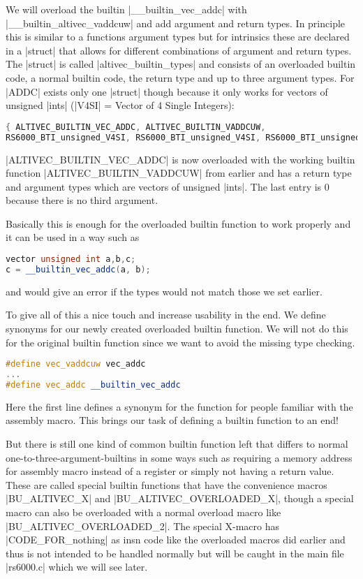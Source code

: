 We will overload the builtin |__builtin_vec_addc| with |__builtin_altivec_vaddcuw| and add argument and return types. In principle this is similar to a functions argument types but for intrinsics these are declared in a |struct| that allows for different combinations of argument and return types. The |struct| is called |altivec_builtin_types| and consists of an overloaded builtin code, a normal builtin code, the return type and up to three argument types. For |ADDC| exists only one |struct| though because it only works for vectors of unsigned |ints| (|V4SI| = Vector of 4 Single Integers):
\begin{lstlisting}[language=C++,basicstyle=\ttfamily\scriptsize,keywordstyle=\color{red}]
{ ALTIVEC_BUILTIN_VEC_ADDC, ALTIVEC_BUILTIN_VADDCUW,
RS6000_BTI_unsigned_V4SI, RS6000_BTI_unsigned_V4SI, RS6000_BTI_unsigned_V4SI, 0 }			
\end{lstlisting}
|ALTIVEC_BUILTIN_VEC_ADDC| is now overloaded with the working builtin function |ALTIVEC_BUILTIN_VADDCUW| from earlier and has a return type and argument types which are vectors of unsigned |ints|. The last entry is 0 because there is no third argument.

Basically this is enough for the overloaded builtin function to work properly and it can be used in a way such as
\begin{lstlisting}[language=C++,basicstyle=\ttfamily\scriptsize,keywordstyle=\color{red}] 
vector unsigned int a,b,c;
c = __builtin_vec_addc(a, b);
\end{lstlisting}
and would give an error if the types would not match those we set earlier.

To give all of this a nice touch and increase usability in the end. We define synonyms for our newly created overloaded builtin function. We will not do this for the original builtin function since we want to avoid the missing type checking.
\begin{lstlisting}[language=C++,basicstyle=\ttfamily\scriptsize,keywordstyle=\color{red}] 
#define vec_vaddcuw vec_addc
...
#define vec_addc __builtin_vec_addc
\end{lstlisting}
Here the first line defines a synonym for the function for people familiar with the assembly macro.
This brings our task of defining a builtin function to an end!

But there is still one kind of common builtin function left that differs to normal one-to-three-argument-builtins in some ways such as requiring a memory address for assembly macro instead of a register or simply not having a return value. These are called special builtin functions that have the convenience macros |BU_ALTIVEC_X| and |BU_ALTIVEC_OVERLOADED_X|, though a special macro can also be overloaded with a normal overload macro like |BU_ALTIVEC_OVERLOADED_2|.
The special X-macro has |CODE_FOR_nothing| as insn code like the overloaded macros did earlier and thus is not intended to be handled normally but will be caught in the main file |rs6000.c| which we will see later.

